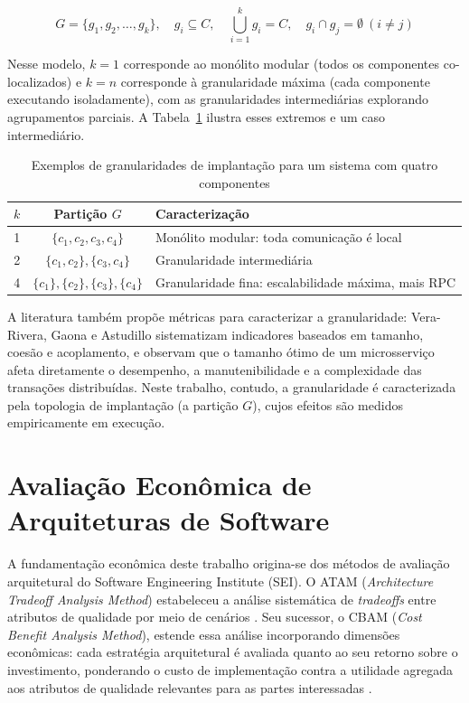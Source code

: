 \begin{equation}
    G = \{g_1, g_2, \ldots, g_k\}, \quad g_i \subseteq C, \quad \bigcup_{i=1}^{k} g_i = C, \quad g_i \cap g_j = \emptyset \ (i \neq j)
\end{equation}

Nesse modelo, $k = 1$ corresponde ao monólito modular (todos os componentes co-localizados) e $k = n$ corresponde à granularidade máxima (cada componente executando isoladamente), com as granularidades intermediárias explorando agrupamentos parciais. A Tabela~\ref{tab:exemplo-particoes} ilustra esses extremos e um caso intermediário.

\begin{table}[htb]
    \centering
    \caption{Exemplos de granularidades de implantação para um sistema com quatro componentes}
    \label{tab:exemplo-particoes}
    \begin{tabular}{c c l}
        \toprule
        $k$ & Partição $G$ & Caracterização \\
        \midrule
        1 & $\{c_1, c_2, c_3, c_4\}$ & Monólito modular: toda comunicação é local \\
        2 & $\{c_1, c_2\}, \{c_3, c_4\}$ & Granularidade intermediária \\
        4 & $\{c_1\}, \{c_2\}, \{c_3\}, \{c_4\}$ & Granularidade fina: escalabilidade máxima, mais RPC \\
        \bottomrule
    \end{tabular}
\end{table}

A literatura também propõe métricas para caracterizar a granularidade: Vera-Rivera, Gaona e Astudillo \cite{verarivera2021granularity} sistematizam indicadores baseados em tamanho, coesão e acoplamento, e observam que o tamanho ótimo de um microsserviço afeta diretamente o desempenho, a manutenibilidade e a complexidade das transações distribuídas. Neste trabalho, contudo, a granularidade é caracterizada pela topologia de implantação (a partição $G$), cujos efeitos são medidos empiricamente em execução.

\section{Avaliação Econômica de Arquiteturas de Software}
\label{sec:avaliacao-economica}

A fundamentação econômica deste trabalho origina-se dos métodos de avaliação arquitetural do Software Engineering Institute (SEI). O ATAM (\textit{Architecture Tradeoff Analysis Method}) estabeleceu a análise sistemática de \textit{tradeoffs} entre atributos de qualidade por meio de cenários \cite{kazman2000atam}. Seu sucessor, o CBAM (\textit{Cost Benefit Analysis Method}), estende essa análise incorporando dimensões econômicas: cada estratégia arquitetural é avaliada quanto ao seu retorno sobre o investimento, ponderando o custo de implementação contra a utilidade agregada aos atributos de qualidade relevantes para as partes interessadas \cite{asundi2001cbam}.

